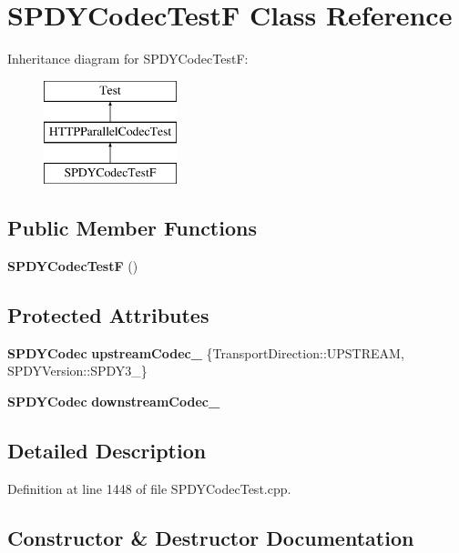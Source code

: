 \section{S\+P\+D\+Y\+Codec\+TestF Class Reference}
\label{classSPDYCodecTestF}
Inheritance diagram for S\+P\+D\+Y\+Codec\+TestF\+:\begin{figure}[H]
\begin{center}
\leavevmode
\includegraphics[height=3.000000cm]{classSPDYCodecTestF}
\end{center}
\end{figure}
\subsection*{Public Member Functions}
\begin{DoxyCompactItemize}
\item 
{\bf S\+P\+D\+Y\+Codec\+TestF} ()
\end{DoxyCompactItemize}
\subsection*{Protected Attributes}
\begin{DoxyCompactItemize}
\item 
{\bf S\+P\+D\+Y\+Codec} {\bf upstream\+Codec\+\_\+} \{Transport\+Direction\+::\+U\+P\+S\+T\+R\+E\+AM, S\+P\+D\+Y\+Version\+::\+S\+P\+D\+Y3\+\_\}
\item 
{\bf S\+P\+D\+Y\+Codec} {\bf downstream\+Codec\+\_\+}
\end{DoxyCompactItemize}


\subsection{Detailed Description}


Definition at line 1448 of file S\+P\+D\+Y\+Codec\+Test.\+cpp.



\subsection{Constructor \& Destructor Documentation}
